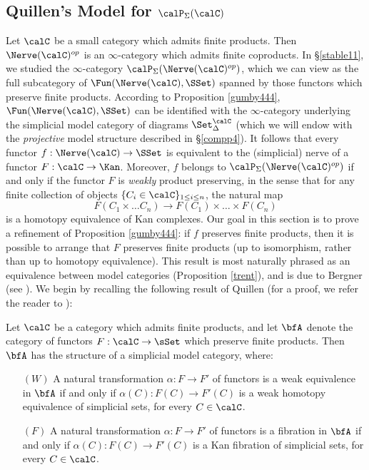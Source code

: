 \subsection{Quillen's Model for $\calP_{\Sigma}(\calC)$}\label{stable12} 
 
Let $\calC$ be a small category which admits finite products. Then $\Nerve(\calC)^{op}$ is an $\infty$-category which admits finite coproducts. In \S \ref{stable11}, we studied the $\infty$-category $\calP_{\Sigma}( \Nerve(\calC)^{op} )$, which we can view as the full subcategory of
$\Fun( \Nerve(\calC), \SSet)$ spanned by those functors which preserve finite products. According to Proposition \ref{gumby444}, $\Fun( \Nerve(\calC), \SSet)$ can be identified with the $\infty$-category underlying the simplicial model category of diagrams $\Set_{\Delta}^{\calC}$ (which we will endow with the {\em projective} model structure described in \S \ref{compp4}). It follows that every functor
$f: \Nerve(\calC) \rightarrow \SSet$ is equivalent to the (simplicial) nerve of a functor $F: \calC \rightarrow \Kan$. Moreover, $f$ belongs to $\calP_{\Sigma}( \Nerve(\calC)^{op})$ if and only if the functor
$F$ is {\em weakly} product preserving, in the sense that for any finite collection of objects $\{ C_i \in \calC \}_{1 \leq i \leq n}$, the natural map $$F( C_1 \times \ldots C_n ) \rightarrow F(C_1) \times \ldots \times F(C_n)$$ is a homotopy equivalence of Kan complexes. Our goal in this section is to prove a refinement of Proposition \ref{gumby444}: if $f$ preserves finite products, then it is possible to arrange that $F$ preserves finite products (up to isomorphism, rather than up to homotopy equivalence). This result is most naturally phrased as an equivalence between model categories (Proposition \ref{trent}), and is due to Bergner (see \cite{bergner3}). We begin by recalling the following result of Quillen (for a proof, we refer the reader to
\cite{homotopicalalgebra}):

\begin{proposition}[Quillen]\label{sutcoat}
Let $\calC$ be a category which admits finite products, and let
$\bfA$ denote the category of functors $F: \calC \rightarrow \sSet$
which preserve finite products. Then $\bfA$ has the structure of a simplicial model category, where:
\begin{itemize}
\item[$(W)$] A natural transformation $\alpha: F \rightarrow F'$ of functors
is a weak equivalence in $\bfA$ if and only if $\alpha(C): F(C) \rightarrow F'(C)$ is a weak
homotopy equivalence of simplicial sets, for every $C \in \calC$. 
\item[$(F)$] A natural transformation $\alpha: F \rightarrow F'$ of functors
is a fibration in $\bfA$ if and only if $\alpha(C): F(C) \rightarrow F'(C)$ is a Kan fibration of simplicial sets, for every $C \in \calC$. 
\end{itemize}
\end{proposition}

